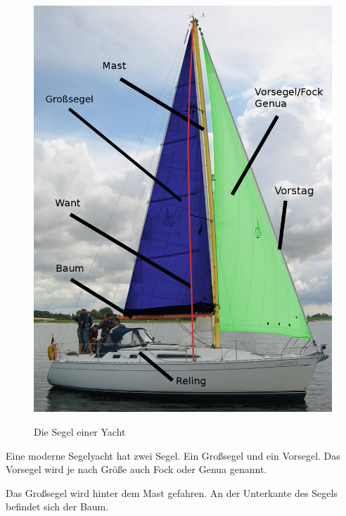 \documentclass[12pt]{article}
\begin{document}
\begin{figure}[H]
\begin{center}
\label{segel}
\includegraphics[scale=0.2]{bilder/yacht.png}
\end{center}
\caption{Die Segel einer Yacht}
\end{figure}

Eine moderne Segelyacht hat zwei Segel. Ein Großsegel und ein Vorsegel.
Das Vorsegel wird je nach Größe auch Fock oder Genua genannt.

Das Großsegel wird hinter dem Mast gefahren. An der Unterkante des Segels befindet sich der Baum.
\end{document}
